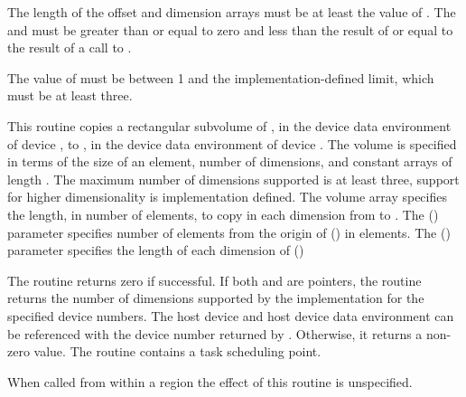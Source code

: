 \constraints
The length of the offset and dimension arrays must be at least the
value of .
The  and 
must be greater than or equal to zero and less than the result of
 or equal to the result of a call to
.

The value of  must be between 1 and the implementation-defined
limit, which must be at least three.


\pagebreak
{}
\effect

This routine copies a rectangular subvolume of ,
in the device data environment of device ,
to , in the device data environment of device .
The volume is specified in terms of the size of an element, 
number of dimensions, and constant arrays of length .  The 
maximum number of dimensions supported is at least three, support for higher 
dimensionality is implementation defined. The volume array specifies the 
length, in number of elements, to copy in each dimension from  
to . The  () parameter specifies
number of elements from the origin of  () in elements.  
The  () parameter specifies the 
length of each dimension of  ()

The routine returns zero if successful. If both  and  are
 pointers, the routine returns the number of dimensions supported
by the implementation for the specified device numbers. The host device and
host device data environment can be referenced with the device number returned
by .  Otherwise, it returns a non-zero value. The
routine contains a task scheduling point.

When called from within a  region 
the effect of this routine is unspecified.


